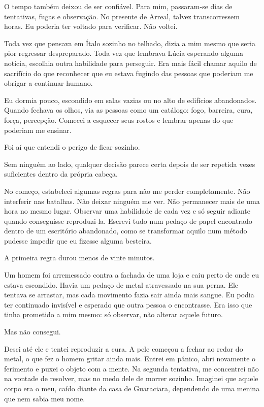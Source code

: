 O tempo também deixou de ser confiável. Para mim, passaram-se dias de tentativas, fugas e observação. No presente de Arreal, talvez transcorressem horas. Eu poderia ter voltado para verificar. Não voltei.

Toda vez que pensava em Ítalo sozinho no telhado, dizia a mim mesmo que seria pior regressar despreparado. Toda vez que lembrava Lúcia esperando alguma notícia, escolhia outra habilidade para perseguir. Era mais fácil chamar aquilo de sacrifício do que reconhecer que eu estava fugindo das pessoas que poderiam me obrigar a continuar humano.

Eu dormia pouco, escondido em salas vazias ou no alto de edifícios abandonados. Quando fechava os olhos, via as pessoas como um catálogo: fogo, barreira, cura, força, percepção. Comecei a esquecer seus rostos e lembrar apenas do que poderiam me ensinar.

Foi aí que entendi o perigo de ficar sozinho.

Sem ninguém ao lado, qualquer decisão parece certa depois de ser repetida vezes suficientes dentro da própria cabeça.

No começo, estabeleci algumas regras para não me perder completamente. Não interferir nas batalhas. Não deixar ninguém me ver. Não permanecer mais de uma hora no mesmo lugar. Observar uma habilidade de cada vez e só seguir adiante quando conseguisse reproduzi-la. Escrevi tudo num pedaço de papel encontrado dentro de um escritório abandonado, como se transformar aquilo num método pudesse impedir que eu fizesse alguma besteira.

A primeira regra durou menos de vinte minutos.

Um homem foi arremessado contra a fachada de uma loja e caiu perto de onde eu estava escondido. Havia um pedaço de metal atravessado na sua perna. Ele tentava se arrastar, mas cada movimento fazia sair ainda mais sangue. Eu podia ter continuado invisível e esperado que outra pessoa o encontrasse. Era isso que tinha prometido a mim mesmo: só observar, não alterar aquele futuro.

Mas não consegui.

Desci até ele e tentei reproduzir a cura. A pele começou a fechar ao redor do metal, o que fez o homem gritar ainda mais. Entrei em pânico, abri novamente o ferimento e puxei o objeto com a mente. Na segunda tentativa, me concentrei não na vontade de resolver, mas no medo dele de morrer sozinho. Imaginei que aquele corpo era o meu, caído diante da casa de Guaraciara, dependendo de uma menina que nem sabia meu nome.

